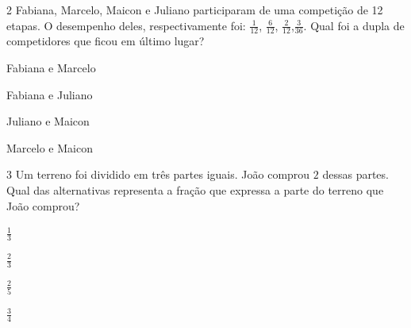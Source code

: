 

\num{2} Fabiana, Marcelo, Maicon e Juliano participaram de uma competição de
12 etapas. O desempenho deles, respectivamente foi: $\frac{1}{12}$,
$\frac{6}{12}$, $\frac{2}{12}$,$\frac{3}{36}$. Qual foi a dupla de
competidores que ficou em último lugar?

\begin{multicols}{2}
\begin{escolha}[itemsep=0pt]
\item
  Fabiana e Marcelo
\item
  Fabiana e Juliano
\item
  Juliano e Maicon
\item
  Marcelo e Maicon
\end{escolha}
\end{multicols}



\num{3} Um terreno foi dividido em três partes iguais. João comprou $2$ dessas
partes. Qual das alternativas representa a fração que expressa a parte
do terreno que João comprou?

\begin{multicols}{4}
\begin{escolha}[itemsep=0pt]
\item $\frac{1}{3}$
\item $\frac{2}{3}$
\item $\frac{2}{5}$
\item $\frac{3}{4}$
\end{escolha}
\end{multicols}


